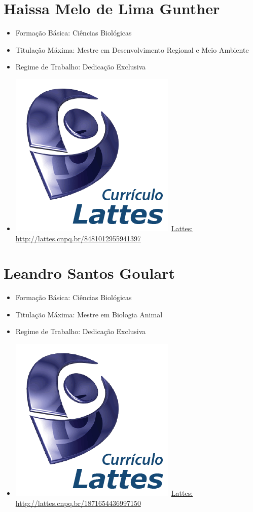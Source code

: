 \documentclass[11pt,fleqn]{book} %
\begin{document}
\section{Haissa Melo de Lima Gunther}\label{HaissaGunther}
\begin{itemize}
	\item Formação Básica: Ciências Biológicas
	\item Titulação Máxima: Mestre em Desenvolvimento Regional e Meio Ambiente
	\item Regime de Trabalho: Dedicação Exclusiva
	\item \includegraphics[scale=.03]{Pictures/lattes}~\href{http://lattes.cnpq.br/8481012955941397}{Lattes: http://lattes.cnpq.br/8481012955941397}
\end{itemize}

\section{Leandro Santos Goulart}\label{LeandroGoulart}
\begin{itemize}
	\item Formação Básica: Ciências Biológicas
	\item Titulação Máxima: Mestre em Biologia Animal
	\item Regime de Trabalho: Dedicação Exclusiva
	\item \includegraphics[scale=.03]{Pictures/lattes}~\href{http://lattes.cnpq.br/1871654436997150}{Lattes: http://lattes.cnpq.br/1871654436997150}
\end{itemize}
\end{document}
